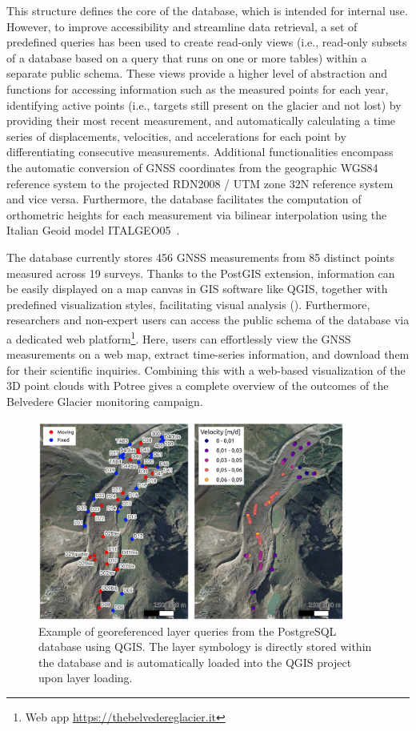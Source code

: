 This structure defines the core of the database, which is intended for internal use. 
However, to improve accessibility and streamline data retrieval, a set of predefined queries has been used to create read-only views (i.e., read-only subsets of a database based on a query that runs on one or more tables) within a separate public schema. 
These views provide a higher level of abstraction and functions for accessing information such as the measured points for each year, identifying active points (i.e., targets still present on the glacier and not lost) by providing their most recent measurement, and automatically calculating a time series of displacements, velocities, and accelerations for each point by differentiating consecutive measurements.
Additional functionalities encompass the automatic conversion of GNSS coordinates from the geographic WGS84 reference system to the projected RDN2008 / UTM zone 32N reference system and vice versa. 
Furthermore, the database facilitates the computation of orthometric heights for each measurement via bilinear interpolation using the Italian Geoid model ITALGEO05~\citep{Barzaghi2007}.

The database currently stores 456 GNSS measurements from 85 distinct points measured across 19 surveys. 
Thanks to the PostGIS extension, information can be easily displayed on a map canvas in GIS software like QGIS, together with predefined visualization styles, facilitating visual analysis ().
Furthermore, researchers and non-expert users can access the public schema of the database via a dedicated web platform\footnote{Web app \url{https://thebelvedereglacier.it}}. 
Here, users can effortlessly view the GNSS measurements on a web map, extract time-series information, and download them for their scientific inquiries. 
Combining this with a web-based visualization of the 3D point clouds with Potree gives a complete overview of the outcomes of the Belvedere Glacier monitoring campaign.

\begin{figure}[ht]
  \centering
  \includegraphics[width=0.9\textwidth]{db_qgis_query.png}
    \caption{Example of georeferenced layer queries from the PostgreSQL database using QGIS. The layer symbology is directly stored within the database and is automatically loaded into the QGIS project upon layer loading.}  
    \label{fig:3:db_qgis_query}
\end{figure}

\makechapterbibliography{}

